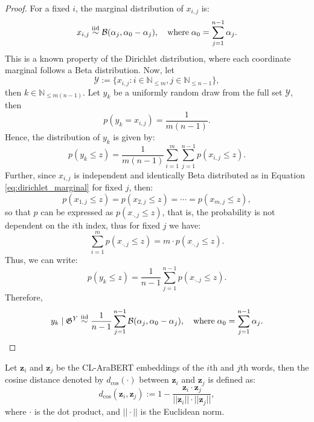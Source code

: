 \begin{proof}
    For a fixed $i$, the marginal distribution of $x_{i,j}$ is:
    \begin{equation}\label{eq:dirichlet_marginal}
        x_{i,j}\overset{\textnormal{iid}}{\sim}\mathcal{B}(\alpha_j,\alpha_0-\alpha_j),\quad\text{where}\;\alpha_0=\sum_{j=1}^{n-1}\alpha_j.
    \end{equation}
    This is a known property of the Dirichlet distribution, where each coordinate marginal follows a Beta distribution. Now, let 
    \begin{equation}
        \mathscr{Y}:=\{x_{i,j}:i\in\mathbb{N}_{\leq m}, j\in\mathbb{N}_{\leq n-1}\},
    \end{equation}
    then $k\in\mathbb{N}_{\leq m(n-1)}$. Let $y_k$ be a uniformly random draw from the full set $\mathscr{Y}$, then 
    \begin{equation}
        p(y_k=x_{i,j})=\frac{1}{m(n-1)}.
    \end{equation}
    Hence, the distribution of $y_k$ is given by:
    \begin{equation}
        p(y_k\leq z)=\frac{1}{m(n-1)}\sum_{i=1}^m\sum_{j=1}^{n-1}p(x_{i,j}\leq z).
    \end{equation}
    Further, since $x_{i,j}$ is independent and identically Beta distributed as in Equation \ref{eq:dirichlet_marginal} for fixed $j$, then:
    \begin{equation}
        p(x_{1,j}\leq z)=p(x_{2,j}\leq z)=\cdots=p(x_{m,j}\leq z),
    \end{equation}
    so that $p$ can be expressed as $p(x_{\cdot,j}\leq z)$, that is, the probability is not dependent on the $i$th index, thus for fixed $j$ we have:
    \begin{equation}
        \sum_{i=1}^m p(x_{\cdot,j}\leq z)=m\cdot p(x_{\cdot,j}\leq z).
    \end{equation}
    Thus, we can write:
    \begin{equation}
        p(y_k\leq z)=\frac{1}{n-1}\sum_{j=1}^{n-1}p(x_{\cdot,j}\leq z).
    \end{equation}
    Therefore,
    \begin{equation}
        y_k\mid\mathfrak{G}^{Y}\overset{\textnormal{iid}}{\sim}\frac{1}{n-1}\sum_{j=1}^{n-1}\mathcal{B}(\alpha_j,\alpha_0-\alpha_j),\quad\text{where}\;\alpha_0=\sum_{j=1}^{n-1}\alpha_j.
    \end{equation}
\end{proof}
\begin{defn}\label{defn:cosine_distance}
    Let $\mathbf{z}_i$ and $\mathbf{z}_j$ be the CL-AraBERT embeddings of the $i$th and $j$th words, then the cosine distance denoted by $d_{\cos}(\cdot)$ between $\mathbf{z}_i$ and $\mathbf{z}_j$ is defined as:
    \begin{equation}
        d_{\cos}(\mathbf{z}_i,\mathbf{z}_j):=1-\frac{\mathbf{z}_i\cdot\mathbf{z}_j}{||\mathbf{z}_i||\cdot||\mathbf{z}_j||},
    \end{equation}
    where $\cdot$ is the dot product, and $||\cdot||$ is the Euclidean norm.
\end{defn}
